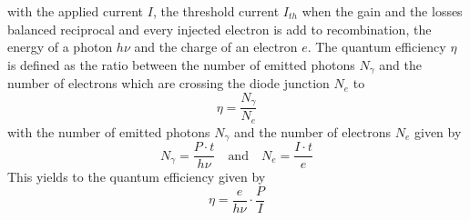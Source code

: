 \documentclass[10pt, a4paper, notitlepage, DIV=15]{scrartcl}
\begin{document}
with the applied current $I$, the threshold current $I_{th}$ when the gain and the losses balanced reciprocal and every injected electron is add to recombination, the energy of a photon $h\nu$ and the charge of an electron $e$. \label{threshold}  
\newline
The quantum efficiency $\eta$ is defined as the ratio between the number of emitted photons $N_{\gamma}$ and the number of electrons which are crossing the diode junction $N_{e}$ to \begin{equation}
	\eta=\frac{N_{\gamma}}{N_e}
\end{equation}
with the number of emitted photons $N_{\gamma}$ and the number of electrons $N_{e}$ given by
\begin{equation}
	N_{\gamma} = \frac{P\cdot t}{h\nu} \quad \textrm{and} \quad N_e=\frac{I\cdot t}{e}
\end{equation}
This yields to the quantum efficiency given by 
\begin{equation} \label{eq:qmefficiency}
	\eta = \frac{e}{h\nu}\cdot \frac{P}{I}
\end{equation} \cite{quantumefficiency}
\newline
\end{document}
